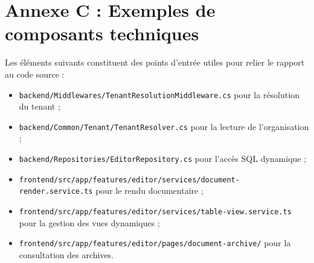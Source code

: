 \section*{Annexe C : Exemples de composants techniques}

Les éléments suivants constituent des points d'entrée utiles pour relier le rapport au code source :

\begin{itemize}
    \item \texttt{backend/Middlewares/TenantResolutionMiddleware.cs} pour la résolution du tenant ;
    \item \texttt{backend/Common/Tenant/TenantResolver.cs} pour la lecture de l'organisation ;
    \item \texttt{backend/Repositories/EditorRepository.cs} pour l'accès SQL dynamique ;
    \item \texttt{frontend/src/app/features/editor/services/document-render.service.ts} pour le rendu documentaire ;
    \item \texttt{frontend/src/app/features/editor/services/table-view.service.ts} pour la gestion des vues dynamiques ;
    \item \texttt{frontend/src/app/features/editor/pages/document-archive/} pour la consultation des archives.
\end{itemize}
